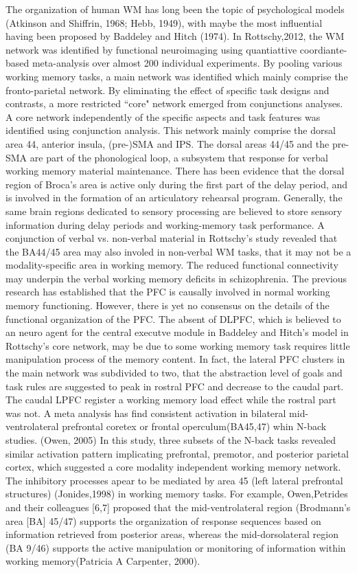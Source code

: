 \documentclass[preprint,authoryear,review,12pt,times]{elsarticle}
\begin{document}
The organization of human WM has long been the topic of psychological models (Atkinson and Shiffrin, 1968; Hebb, 1949), with maybe the most influential having been proposed by Baddeley and Hitch (1974). In Rottschy,2012, the WM network was identified by functional neuroimaging using quantiattive coordiante-based meta-analysis over almost 200 individual experiments. By pooling various working memory tasks, a main network was identified which mainly comprise the fronto-parietal network. By eliminating the effect of specific task designs and contrasts, a more restricted ``core" network emerged from conjunctions analyses. A core network independently of the specific aspects and task features was identified using conjunction analysis. This network mainly comprise the dorsal area 44, anterior insula, (pre-)SMA and IPS. The dorsal areas 44/45 and the pre-SMA are part of the phonological loop, a subsystem that response for verbal working memory material maintenance. There has been evidence that the dorsal region of Broca's area is active only during the first part of the delay period, and is involved in the formation of an articulatory rehearsal program. Generally, the same brain regions dedicated to sensory processing are believed to store sensory information during delay periods and working-memory task performance. A conjunction of verbal vs. non-verbal material in Rottschy's study revealed that the BA44/45 area may also involed in non-verbal WM tasks, that it may not be a modality-specific area in working memory. The reduced functional connectivity may underpin the verbal working memory deficits in schizophrenia. The previous research has established that the PFC is causally involved in normal working  memory functioning. However, there is yet no consensus on the details of the functional organization of the PFC. The absent of DLPFC, which is believed to an neuro agent for the central executve module in Baddeley and Hitch's model in Rottschy's core network, may be due to some working memory task requires little manipulation process of the memory content. In fact, the lateral PFC clusters in the main network was subdivided to two, that the abstraction level of goals and task rules are suggested to peak in rostral PFC and decrease to the caudal part. The caudal LPFC register a working memory load effect while the rostral part was not. A meta analysis has find consistent activation in bilateral mid-ventrolateral prefrontal coretex or frontal operculum(BA45,47) whin N-back studies. (Owen, 2005) In this study, three subsets of the N-back tasks revealed similar activation pattern implicating prefrontal, premotor, and posterior parietal cortex, which suggested a core modality independent working memory network. The inhibitory processes apear to be mediated by area 45 (left lateral prefrontal structures) (Jonides,1998) in working memory tasks.  For  example,  Owen,Petrides and their colleagues [6,7] proposed that the mid-ventrolateral region (Brodmann’s area [BA] 45/47) supports the organization of response sequences based on information  retrieved  from  posterior  areas,  whereas  the mid-dorsolateral  region  (BA 9/46)  supports  the  active manipulation or monitoring of information within working memory(Patricia A Carpenter, 2000).  
\end{document}
